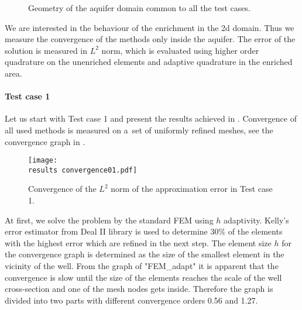 \begin{figure}[!htb]
    \centering    
    \def\svgwidth{0.35\textwidth}
        
  \caption[Geometry of the aquifer domain.]{Geometry of the aquifer domain common to all the test cases.}
  \label{fig:test_cases_geometry}
\end{figure}

%       


We are interested in the behaviour of the enrichment in the 2d domain.
Thus we measure the convergence of the methods only inside the aquifer.
The error of the solution is measured in $L^2$ norm, which is evaluated using higher order quadrature
on the unenriched elements and adaptive quadrature in the enriched area.

\paragraph{Test case 1}
Let us start with Test case 1 and present the results achieved in \cite{exner_2016}.
Convergence of all used methods is measured on a~set of uniformly refined meshes, 
see the convergence graph in .
%
\begin{figure}[!htb]
  \centering    
  \texttt{[image: \\results convergence01.pdf]}
  \caption[Convergence graph in Test case 1]{Convergence of the $L^2$ norm of the approximation error in Test case 1.}
  \label{fig:convergence01}
\end{figure}
%
At first, we solve the problem by the standard FEM using $h$ adaptivity.
Kelly's error estimator from Deal II library is used to determine 30\% of the elements
with the highest error which are refined in the next step.
The element size $h$ for the convergence graph is determined as the size of the smallest element in the 
vicinity of the well.
From the graph of "FEM\_adapt" it is apparent that the convergence is slow until the size of the elements reaches the scale of the
well cross-section and one of the mesh nodes gets inside. 
Therefore the graph is divided into two parts with different convergence orders 0.56 and 1.27.

